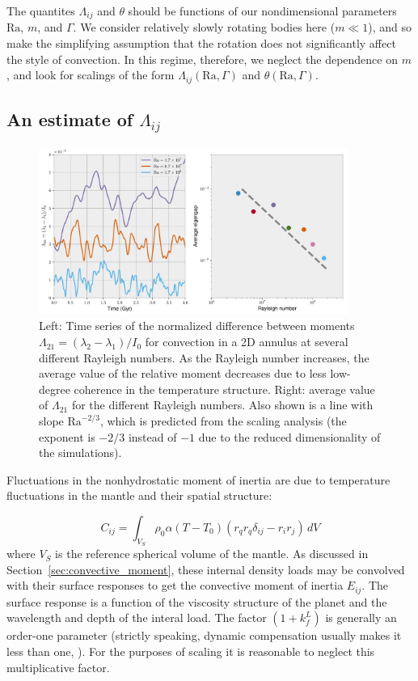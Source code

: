 \documentclass[extra,mreferee]{gji}
\begin{document}
The quantites $\Lambda_{ij}$ and $\theta$ should be functions of our nondimensional parameters $\mathrm{Ra}$, $m$, and $\Gamma$.  
We consider relatively slowly rotating bodies here ($m \ll 1$), and so make the simplifying assumption that the rotation does not significantly affect the style of convection.  
In this regime, therefore, we neglect the dependence on $m$, and look for scalings of the form $\Lambda_{ij}(\mathrm{Ra}, \Gamma)$ and $\theta(\mathrm{Ra}, \Gamma)$.


\subsection{An estimate of $\Lambda_{ij}$}
\label{sec:lambda}

\begin{figure}
\centering
\includegraphics[width=0.9\textwidth]{figures/eigengap.pdf}
\caption{ Left: Time series of the normalized difference between moments $\Lambda_{21} = (\lambda_2 - \lambda_1)/I_0$ for convection in a 2D annulus at several different Rayleigh numbers.  As the Rayleigh number increases, the average value of the relative moment decreases due to less low-degree coherence in the temperature structure.  Right:  average value of $\Lambda_{21}$ for the different Rayleigh numbers.  Also shown is a line with slope $\mathrm{Ra}^{-2/3}$, which is predicted from the scaling analysis (the exponent is $-2/3$ instead of $-1$ due to the reduced dimensionality of the simulations).}
\label{fig:eigengap}
\end{figure}


Fluctuations in the nonhydrostatic moment of inertia are due to temperature fluctuations in the mantle and their spatial structure:

\begin{equation}
C_{ij} = \int_{V_S} \rho_0 \alpha (T-T_0) \left( r_q r_q \delta_{ij} - r_i r_j \right) \,dV
\label{eq:temperature_fluctuations}
\end{equation}
where $V_S$ is the reference spherical volume of the mantle.
As discussed in Section~\ref{sec:convective_moment}, these internal density loads may be convolved with their surface responses to get the convective moment of inertia $E_{ij}$.
The surface response is a function of the viscosity structure of the planet and the wavelength and depth of the interal load.
The factor $(1+k^L_f)$ is generally an order-one parameter 
(strictly speaking, dynamic compensation usually makes it less than one, \citep[e.g.][]{richards1984geoid}). 
For the purposes of scaling it is reasonable to neglect this multiplicative factor.
\end{document}

